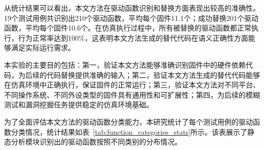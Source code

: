 从统计结果可以看出，本文方法在驱动函数识别和替换方面表现出较高的准确性。19个测试用例共识别出210个驱动函数，平均每个固件11.1个；成功替换201个驱动函数，平均每个固件10.6个。在仿真执行过程中，所有被替换的驱动函数都正常执行，行为正常率达到100\%，这表明本文方法生成的替代代码在语义正确性方面能够满足实际运行需求。

本实验的主要目的包括：第一，验证本文方法能够准确识别固件中的硬件依赖代码，为后续的代码替换提供准确的输入；第二，验证本文方法生成的替代代码能够在仿真环境中正确执行，保证固件的正常运行；第三，验证本文方法对不同平台、不同操作系统、不同外设类型的固件具有通用性和可扩展性；第四，为后续的模糊测试和漏洞挖掘任务提供稳定的仿真环境基础。

为了全面评估本文方法的驱动函数分类能力，本研究统计了每个测试用例的驱动函数分类情况，统计结果如表~\ref{tab:function_categories_stats}所示。该表展示了静态分析模块识别出的驱动函数按照不同类别的分布情况。

